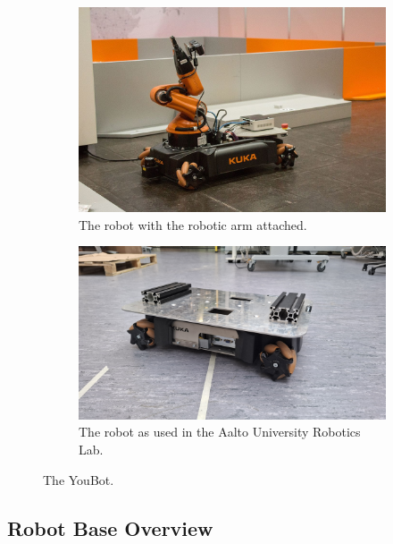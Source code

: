 \documentclass[a4paper, 12pt]{article}
\begin{document}
    \begin{figure}[ht]
        \centering
        \begin{subfigure}[t]{0.49\linewidth}
            \centering
            \includegraphics[width=\linewidth]{images/sec2/youbot_with_arm.png}
            \caption{The robot with the robotic arm attached.}
        \end{subfigure}
        \hfill
        \begin{subfigure}[t]{0.49\linewidth}
            \centering
            \includegraphics[width=\linewidth]{images/sec2/youbot_irl.jpg}
            \caption{The robot as used in the Aalto University Robotics Lab.}
        \end{subfigure}
        \caption{The YouBot.}
    \end{figure}

    \subsection{Robot Base Overview}
\end{document}
